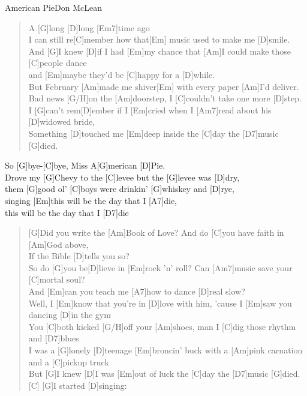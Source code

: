 \begin{song}{American Pie}{Don McLean}

    \begin{verse}  
        A [G]long [D]long [Em7]time ago \\
        [Am]I can still re[C]member how that[Em] music used to make me [D]smile. \\
        And [G]I knew [D]if I had [Em]my chance that [Am]I could make those [C]people dance \\
        and [Em]maybe they'd be [C]happy for a [D]while. \\
        [Em] But February [Am]made me shiver[Em] with every paper [Am]I'd deliver. \\
        [C]Bad news [G/H]on the [Am]doorstep, I [C]couldn't take one more [D]step. \\
        I [G]can't rem[D]ember if I [Em]cried when I [Am7]read about his [D]widowed bride, \\
        [G]Something [D]touched me [Em]deep inside the [C]day the [D7]music [G]died.
    \end{verse}  

    \begin{chorus}
        So [G]bye-[C]bye, Miss A[G]merican [D]Pie. \\
        Drove my [G]Chevy to the [C]levee but the [G]levee was [D]dry, \\
        them [G]good ol' [C]boys were drinkin' [G]whiskey and [D]rye, \\
        singing [Em]this will be the day that I [A7]die, \\
        [Em]this will be the day that I [D7]die
    \end{chorus}

    \begin{verse}  
        [G]Did you write the [Am]Book of Love? And do [C]you have faith in [Am]God above, \\
        [Em] If the Bible [D]tells you so? \\
        So do [G]you be[D]lieve in [Em]rock 'n' roll? Can [Am7]music save your [C]mortal soul? \\
        And [Em]can you teach me [A7]how to dance [D]real slow? \\
        Well, I [Em]know that you're in [D]love with him, 'cause I [Em]saw you dancing [D]in the
        gym \\
        You [C]both kicked [G/H]off your [Am]shoes, man I [C]dig those rhythm and [D7]blues\\
        I was a [G]lonely [D]teenage [Em]broncin' buck with a [Am]pink carnation and a [C]pickup truck\\
        But [G]I knew [D]I was [Em]out of luck the [C]day the [D7]music [G]died.[C] \hspace{1em} [G]I started [D]singing:
    \end{verse}  


\end{song}
